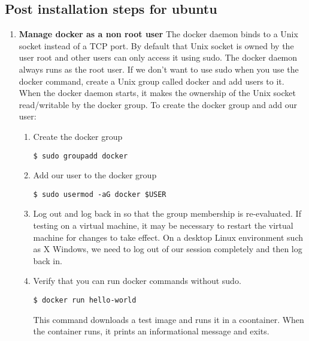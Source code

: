 \subsection{Post installation steps for ubuntu}
\begin{enumerate}
	\item
	\textbf{Manage docker as a non root user}\newline
The docker daemon binds to a Unix socket instead of a TCP port. By default that Unix socket is
owned by the user root and other users can only access it using sudo. The docker daemon always
runs as the root user.
If we don’t want to use sudo when you use the docker command, create a Unix group called docker
and add users to it. When the docker daemon starts, it makes the ownership of the Unix socket
read/writable by the docker group.
To create the docker group and add our user:
	\begin{enumerate}
		\item Create the docker group \newline\begin{center}\verb=$ sudo groupadd docker=\end{center}
		\item Add our user to the docker group \newline\begin{center}\verb=$ sudo usermod -aG docker $USER=\end{center}
		\item Log out and log back in so that the group membership is re-evaluated. If testing on a virtual
machine, it may be necessary to restart the virtual machine for changes to take effect.\newline
On a desktop Linux environment such as X Windows, we need to log out of our session
completely and then log back in.
		\item Verify that you can run docker commands without sudo.\newline\begin{center}\verb=$ docker run hello-world=\end{center}
			This command downloads a test image and runs it in a coontainer. When the container runs, it prints an informational message and exits.
	\end{enumerate}


\end{enumerate}
